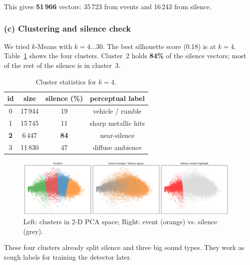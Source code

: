 \documentclass{article}
\begin{document}
This gives \textbf{51\,966} vectors: 35\,723 from events and 16\,243 from silence.

\subsubsection{(c) Clustering and silence check}
We tried $k$‑Means with $k=4\ldots30$. The best silhouette score (0.18) is at $k=4$. Table~\ref{tab:cluster} shows the four clusters. Cluster~2 holds \textbf{84\%} of the silence vectors; most of the rest of the silence is in cluster~3.

\begin{table}[h]
    \caption{Cluster statistics for $k=4$.}
    \label{tab:cluster}
    \centering
    \begin{tabular}{cccc}
        \toprule
        id & size & silence (\%) & perceptual label \\ \midrule
        0 & 17\,944 & 19 & vehicle / rumble \\
        1 & 15\,745 & 11 & sharp metallic hits \\
        \textbf{2} & 6\,447 & \textbf{84} & near‑silence \\
        3 & 11\,830 & 47 & diffuse ambience \\ \bottomrule
    \end{tabular}
\end{table}

\begin{figure}[h]
    \centering
    \includegraphics[width=.45\linewidth]{figs_tang/03_pca_clusters.png}
    \caption{Left: clusters in 2‑D PCA space; Right: event (orange) vs. silence (grey).}
    \label{fig:pca_scatter}
\end{figure}

These four clusters already split silence and three big sound types. They work as rough labels for training the detector later.

\end{document}
